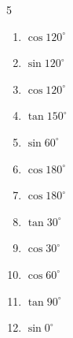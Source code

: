 \begin{multicols}{5}
\begin{enumerate}

  \item $\displaystyle \cos{120^\circ}$


  \item $\displaystyle \sin{120^\circ}$


  \item $\displaystyle \cos{120^\circ}$


  \item $\displaystyle \tan{150^\circ}$


  \item $\displaystyle \sin{60^\circ}$


  \item $\displaystyle \cos{180^\circ}$

        \phantom{$\displaystyle =-1$}

  \item $\displaystyle \cos{180^\circ}$

        \phantom{$\displaystyle =-1$}

  \item $\displaystyle \tan{30^\circ}$


\columnbreak %

  \item $\displaystyle \cos{30^\circ}$


  \item $\displaystyle \cos{60^\circ}$


  \item $\displaystyle \tan{90^\circ}$

        \phantom{$\displaystyle なし$}

  \item $\displaystyle \sin{0^\circ}$

        \phantom{$\displaystyle =0$}


\end{enumerate}
\end{multicols}

